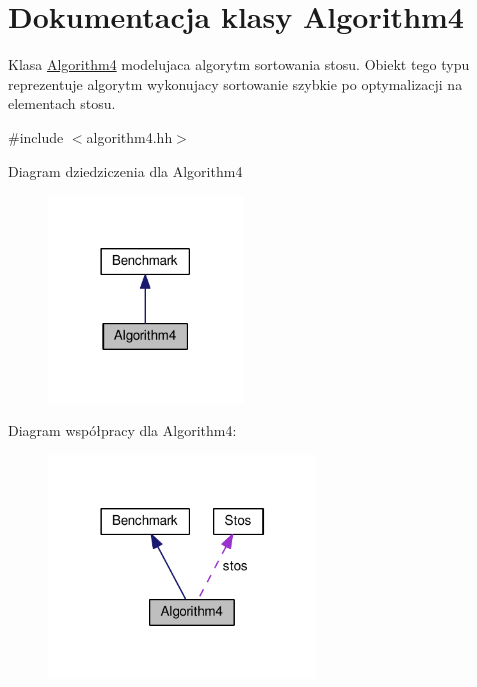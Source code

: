\hypertarget{class_algorithm4}{\section{Dokumentacja klasy Algorithm4}
\label{class_algorithm4}
}


Klasa \hyperlink{class_algorithm4}{Algorithm4} modelujaca algorytm sortowania stosu. Obiekt tego typu reprezentuje algorytm wykonujacy sortowanie szybkie po optymalizacji na elementach stosu.  




{\ttfamily \#include $<$algorithm4.\-hh$>$}



Diagram dziedziczenia dla Algorithm4\nopagebreak
\begin{figure}[H]
\begin{center}
\leavevmode
\includegraphics[width=146pt]{class_algorithm4__inherit__graph}
\end{center}
\end{figure}


Diagram współpracy dla Algorithm4\-:\nopagebreak
\begin{figure}[H]
\begin{center}
\leavevmode
\includegraphics[width=201pt]{class_algorithm4__coll__graph}
\end{center}
\end{figure}
